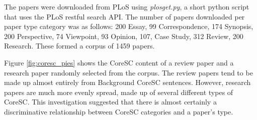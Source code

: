 \documentclass{svmult}
\begin{document}
The papers were downloaded from PLoS using {\em plosget.py}, a short python
script that uses the PLoS restful search API. The number of papers downloaded
per paper type category was as follows: 200 Essay, 99 Correspondence, 174
Synopsis, 200 Perspective, 74 Viewpoint, 93 Opinion, 107, Case Study, 312
Review, 200 Research.  These formed a corpus of 1459 papers.

Figure \ref{fig:coresc_pies} shows the CoreSC content of a review paper and a
research paper randomly selected from the corpus.  The review papers tend to be
made up almost entirely from Background CoreSC sentences.  However, research
papers are much more evenly spread, made up of several different types of
CoreSC.  This investigation suggested that there is almost certainly a
discriminative relationship between CoreSC categories and a paper's type. 
\end{document}
